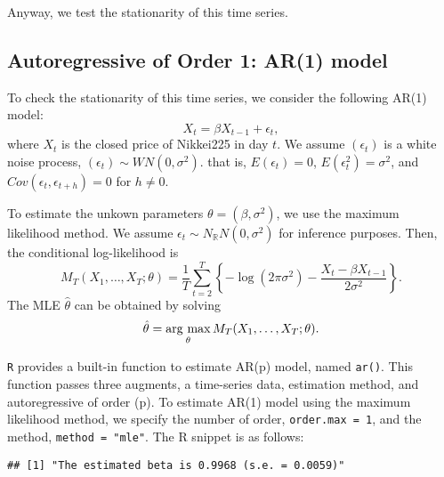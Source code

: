 \documentclass[
  12pt,
]{article}
\newenvironment{Shaded}{\begin{snugshade}}{\end{snugshade}}
\newcommand{\DataTypeTok}[1]{\textcolor[rgb]{0.13,0.29,0.53}{#1}}
\newcommand{\DecValTok}[1]{\textcolor[rgb]{0.00,0.00,0.81}{#1}}
\newcommand{\KeywordTok}[1]{\textcolor[rgb]{0.13,0.29,0.53}{\textbf{#1}}}
\newcommand{\NormalTok}[1]{#1}
\newcommand{\OperatorTok}[1]{\textcolor[rgb]{0.81,0.36,0.00}{\textbf{#1}}}
\newcommand{\StringTok}[1]{\textcolor[rgb]{0.31,0.60,0.02}{#1}}
\begin{document}
Anyway, we test the stationarity of this time series.

\hypertarget{autoregressive-of-order-1-ar1-model}{%
\subsection{Autoregressive of Order 1: AR(1)
model}\label{autoregressive-of-order-1-ar1-model}}

To check the stationarity of this time series, we consider the following
AR(1) model: \[ X_t = \beta X_{t-1} + \epsilon_t, \] where \(X_t\) is
the closed price of Nikkei225 in day \(t\). We assume \((\epsilon_t)\)
is a white noise process, \((\epsilon_t) \sim WN(0, \sigma^2)\). that
is, \(E(\epsilon_t) = 0\), \(E(\epsilon_t^2) = \sigma^2\), and
\(Cov(\epsilon_t, \epsilon_{t+h}) = 0\) for \(h \not= 0\).

To estimate the unkown parameters \(\theta = (\beta, \sigma^2)\), we use
the maximum likelihood method. We assume
\(\epsilon_t \sim N_{\mathbb{R}}N(0, \sigma^2)\) for inference purposes.
Then, the conditional log-likelihood is \[
  M_T(X_1, \ldots, X_T; \theta) 
  = \frac{1}{T} \sum_{t=2}^T \left\{ -\log(2\pi\sigma^2) - \frac{X_t - \beta X_{t-1}}{2\sigma^2} \right\}.
\] The MLE \(\hat{\theta}\) can be obtained by solving
\[ \hat{\theta} = \mathop{\rm arg~max}\limits_{\theta} M_T(X_1, \ldots, X_T; \theta). \]

\texttt{R} provides a built-in function to estimate AR(p) model, named
\texttt{ar()}. This function passes three augments, a time-series data,
estimation method, and autoregressive of order (p). To estimate AR(1)
model using the maximum likelihood method, we specify the number of
order, \texttt{order.max\ =\ 1}, and the method,
\texttt{method\ =\ "mle"}. The R snippet is as follows:

\begin{Shaded}
\end{Shaded}

\begin{verbatim}
## [1] "The estimated beta is 0.9968 (s.e. = 0.0059)"
\end{verbatim}
\end{document}
